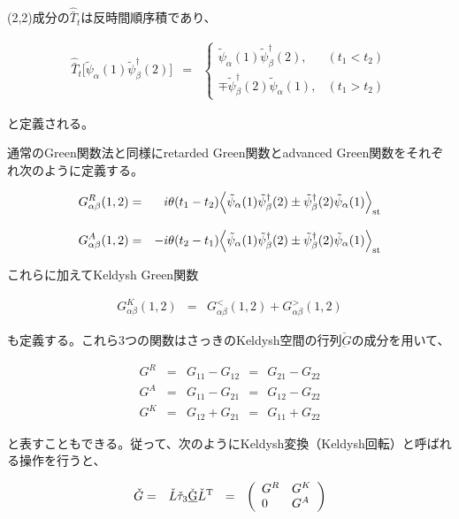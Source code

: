 \documentclass[uplatex,a4j,12pt,dvipdfmx]{jsarticle}
\begin{document}
(2,2)成分の$\hat{\bar{T}}_{t}$は反時間順序積であり、

\begin{eqnarray}
	\hat{\bar{T}}_{t}
	\Big[ \tilde{\psi}_{\alpha}(1) \tilde{\psi}_{\beta}^{\dagger}(2) \Big]
	&=&
	\left\{
	\begin{array}{ll}
		\tilde{\psi}_{\alpha}(1) \tilde{\psi}_{\beta}^{\dagger}(2),     & (t_{1} < t_{2})
		\\[3mm]
		\mp \tilde{\psi}_{\beta}^{\dagger}(2) \tilde{\psi}_{\alpha}(1), & (t_{1} > t_{2})
	\end{array}
	\right.
\end{eqnarray}

と定義される。

通常のGreen関数法と同様にretarded Green関数とadvanced Green関数をそれぞれ次のように定義する。

\begin{eqnarray}
	G^{R}_{\alpha \beta}(1,2)
	&=&
	i \theta( t_{1} - t_{2} ) \Big\langle \tilde{\psi}_{\alpha}(1) \tilde{\psi}_{\beta}^{\dagger}(2) \pm \tilde{\psi}_{\beta}^{\dagger}(2) \tilde{\psi}_{\alpha}(1) \Big\rangle_{\rm st}
	\\[3mm]
	G^{A}_{\alpha \beta}(1,2)
	&=&
	- i \theta( t_{2} - t_{1} ) \Big\langle \tilde{\psi}_{\alpha}(1) \tilde{\psi}_{\beta}^{\dagger}(2) \pm \tilde{\psi}_{\beta}^{\dagger}(2) \tilde{\psi}_{\alpha}(1) \Big\rangle_{\rm st}
\end{eqnarray}

これらに加えてKeldysh Green関数

\begin{eqnarray}
	G^{K}_{\alpha \beta}(1,2)
	&=&
	G^{<}_{\alpha \beta}(1,2)
	+
	G^{>}_{\alpha \beta}(1,2)
	\label{eqn:keldyshg}
\end{eqnarray}

も定義する。これら3つの関数はさっきのKeldysh空間の行列$\check{\underbar{G}}$の成分を用いて、

\begin{eqnarray}
	G^{R}
	&=&
	G_{11} - G_{12}
	\ \ = \ \
	G_{21} - G_{22}
	\\[1mm]
	G^{A}
	&=&
	G_{11} - G_{21}
	\ \ = \ \
	G_{12} - G_{22}
	\\[1mm]
	G^{K}
	&=&
	G_{12} + G_{21}
	\ \ = \ \
	G_{11} + G_{22}
\end{eqnarray}

と表すこともできる。従って、次のようにKeldysh変換（Keldysh回転）と呼ばれる操作を行うと、

\begin{eqnarray}
	\check{G}
	&=&
	\check{L}
	\check{\tau}_{3}
	\check{\underbar{G}}
	\check{L}^{\rm T}
	\ \ = \ \
	\left(
	\begin{array}{ll}
			G^{R} & G^{K}
			\\
			0     & G^{A}
		\end{array}
	\right)
\end{eqnarray}
\end{document}
